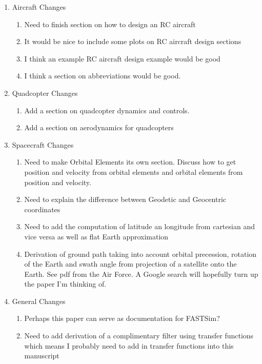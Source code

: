 \documentclass{article}
\begin{document}
\begin{enumerate}[itemsep=-5pt]
  \item Aircraft Changes
  \begin{enumerate}[itemsep=-5pt]
    \item Need to finish section on how to design an RC aircraft
    \item It would be nice to include some plots on RC aircraft design
      sections
    \item I think an example RC aircraft design example would be good
    \item I think a section on abbreviations would be good.
  \end{enumerate}
\item Quadcopter Changes
  \begin{enumerate}[itemsep=-5pt]
  \item Add a section on quadcopter dynamics and controls.
  \item Add a section on aerodynamics for quadcopters
  \end{enumerate}
\item Spacecraft Changes
  \begin{enumerate}[itemsep=-5pt]
  \item Need to make Orbital Elements its own section. Discuss how to
    get position and velocity from orbital elements and orbital elements
    from position and velocity.
  \item Need to explain the difference between Geodetic and Geocentric
    coordinates
  \item Need to add the computation of latitude an longitude from
    cartesian and vice versa as well as flat Earth approximation
  \item Derivation of ground path taking into account orbital
    precession, rotation of the Earth and swath angle from projection of
    a satellite onto the Earth. See pdf from the Air Force. A Google
    search will hopefully turn up the paper I'm thinking of.
  \end{enumerate}
\item General Changes
  \begin{enumerate}[itemsep=-5pt]
  \item Perhaps this paper can serve as documentation for FASTSim?
  \item Need to add derivation of a complimentary filter using
    transfer functions which means I probably need to add in transfer
    functions into this manuscript
  \end{enumerate}
\end{enumerate}
\end{document}
